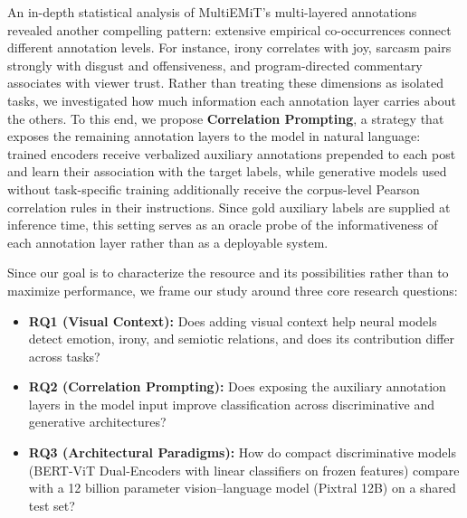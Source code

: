 An in-depth statistical analysis of MultiEMiT's multi-layered annotations revealed another compelling pattern: extensive empirical co-occurrences connect different annotation levels. For instance, irony correlates with joy, sarcasm pairs strongly with disgust and offensiveness, and program-directed commentary associates with viewer trust. Rather than treating these dimensions as isolated tasks, we investigated how much information each annotation layer carries about the others. To this end, we propose \textbf{Correlation Prompting}, a strategy that exposes the remaining annotation layers to the model in natural language: trained encoders receive verbalized auxiliary annotations prepended to each post and learn their association with the target labels, while generative models used without task-specific training additionally receive the corpus-level Pearson correlation rules in their instructions. Since gold auxiliary labels are supplied at inference time, this setting serves as an oracle probe of the informativeness of each annotation layer rather than as a deployable system.

Since our goal is to characterize the resource and its possibilities rather than to maximize performance, we frame our study around three core research questions:
\begin{itemize}
    \item \textbf{RQ1 (Visual Context):} Does adding visual context help neural models detect emotion, irony, and semiotic relations, and does its contribution differ across tasks?
    \item \textbf{RQ2 (Correlation Prompting):} Does exposing the auxiliary annotation layers in the model input improve classification across discriminative and generative architectures?
    \item \textbf{RQ3 (Architectural Paradigms):} How do compact discriminative models (BERT-ViT Dual-Encoders with linear classifiers on frozen features) compare with a 12 billion parameter vision--language model (Pixtral 12B) on a shared test set?
\end{itemize}

